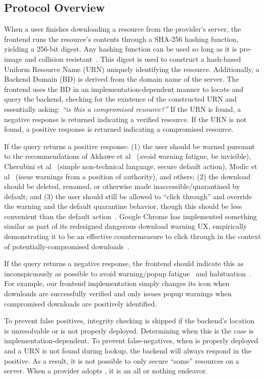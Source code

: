 \subsection{Protocol Overview}

When a user finishes downloading a resource from the provider's server, the
frontend runs the resource's contents through a SHA-256 hashing function,
yielding a 256-bit digest. Any hashing function can be used so long as it is
pre-image and collision resistant~\cite{Rogaway}. This digest is used to
construct a hash-based Uniform Resource Name (URN) uniquely identifying the
resource. Additionally, a Backend Domain (BD) is derived from the domain name of
the server. The frontend uses the BD in an implementation-dependent manner to
locate and query the backend, checking for the existence of the constructed URN
and essentially asking: \emph{``is this a compromised resource?''} If the URN
is found, a negative response is returned indicating a verified resource. If the
URN is not found, a positive response is returned indicating a compromised
resource.

If the query returns a positive response: (1) the user should be warned pursuant
to the recommendations of Akhawe et al~\cite{Akhawe} (avoid warning fatigue, be
invisible), Cherubini et al~\cite{Cherubini} (simple non-technical language,
secure default action), Modic et al~\cite{Modic} (issue warnings from a position
of authority), and others; (2) the download should be deleted, renamed, or
otherwise made inaccessible/quarantined by default; and (3) the user should
still be allowed to ``click through'' and override the warning and the default
quarantine behavior, though this should be less convenient than the default
action~\cite{Cherubini}. Google Chrome has implemented something similar as part
of its redesigned dangerous download warning UX, empirically demonstrating it to
be an effective countermeasure to click through in the context of
potentially-compromised downloads~\cite{ChromeClickThrough}.

If the query returns a negative response, the frontend should indicate this as
inconspicuously as possible to avoid warning/popup fatigue~\cite{Akhawe,
Cherubini} and habituation~\cite{Sunshine}. For example, our frontend
implementation simply changes its icon when downloads are successfully verified
and only issues popup warnings when compromised downloads are positively
identified.

To prevent false positives, integrity checking is skipped if the backend's
location is unresolvable or \SYSTEM{} is not properly deployed. Determining when
this is the case is implementation-dependent. To prevent false-negatives, when
\SYSTEM{} is properly deployed and a URN is not found during lookup, the backend
will always respond in the positive. As a result, it is not possible to only
secure ``some'' resources on a server. When a provider adopts \SYSTEM{}, it is
an all or nothing endeavor.

